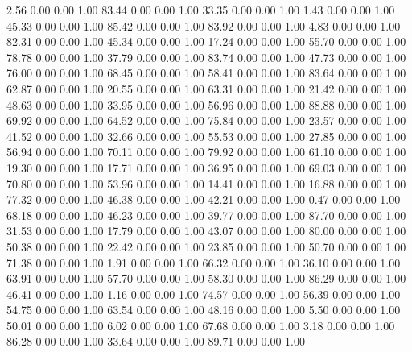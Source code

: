     2.56   0.00   0.00   1.00
   83.44   0.00   0.00   1.00
   33.35   0.00   0.00   1.00
    1.43   0.00   0.00   1.00
   45.33   0.00   0.00   1.00
   85.42   0.00   0.00   1.00
   83.92   0.00   0.00   1.00
    4.83   0.00   0.00   1.00
   82.31   0.00   0.00   1.00
   45.34   0.00   0.00   1.00
   17.24   0.00   0.00   1.00
   55.70   0.00   0.00   1.00
   78.78   0.00   0.00   1.00
   37.79   0.00   0.00   1.00
   83.74   0.00   0.00   1.00
   47.73   0.00   0.00   1.00
   76.00   0.00   0.00   1.00
   68.45   0.00   0.00   1.00
   58.41   0.00   0.00   1.00
   83.64   0.00   0.00   1.00
   62.87   0.00   0.00   1.00
   20.55   0.00   0.00   1.00
   63.31   0.00   0.00   1.00
   21.42   0.00   0.00   1.00
   48.63   0.00   0.00   1.00
   33.95   0.00   0.00   1.00
   56.96   0.00   0.00   1.00
   88.88   0.00   0.00   1.00
   69.92   0.00   0.00   1.00
   64.52   0.00   0.00   1.00
   75.84   0.00   0.00   1.00
   23.57   0.00   0.00   1.00
   41.52   0.00   0.00   1.00
   32.66   0.00   0.00   1.00
   55.53   0.00   0.00   1.00
   27.85   0.00   0.00   1.00
   56.94   0.00   0.00   1.00
   70.11   0.00   0.00   1.00
   79.92   0.00   0.00   1.00
   61.10   0.00   0.00   1.00
   19.30   0.00   0.00   1.00
   17.71   0.00   0.00   1.00
   36.95   0.00   0.00   1.00
   69.03   0.00   0.00   1.00
   70.80   0.00   0.00   1.00
   53.96   0.00   0.00   1.00
   14.41   0.00   0.00   1.00
   16.88   0.00   0.00   1.00
   77.32   0.00   0.00   1.00
   46.38   0.00   0.00   1.00
   42.21   0.00   0.00   1.00
    0.47   0.00   0.00   1.00
   68.18   0.00   0.00   1.00
   46.23   0.00   0.00   1.00
   39.77   0.00   0.00   1.00
   87.70   0.00   0.00   1.00
   31.53   0.00   0.00   1.00
   17.79   0.00   0.00   1.00
   43.07   0.00   0.00   1.00
   80.00   0.00   0.00   1.00
   50.38   0.00   0.00   1.00
   22.42   0.00   0.00   1.00
   23.85   0.00   0.00   1.00
   50.70   0.00   0.00   1.00
   71.38   0.00   0.00   1.00
    1.91   0.00   0.00   1.00
   66.32   0.00   0.00   1.00
   36.10   0.00   0.00   1.00
   63.91   0.00   0.00   1.00
   57.70   0.00   0.00   1.00
   58.30   0.00   0.00   1.00
   86.29   0.00   0.00   1.00
   46.41   0.00   0.00   1.00
    1.16   0.00   0.00   1.00
   74.57   0.00   0.00   1.00
   56.39   0.00   0.00   1.00
   54.75   0.00   0.00   1.00
   63.54   0.00   0.00   1.00
   48.16   0.00   0.00   1.00
    5.50   0.00   0.00   1.00
   50.01   0.00   0.00   1.00
    6.02   0.00   0.00   1.00
   67.68   0.00   0.00   1.00
    3.18   0.00   0.00   1.00
   86.28   0.00   0.00   1.00
   33.64   0.00   0.00   1.00
   89.71   0.00   0.00   1.00
